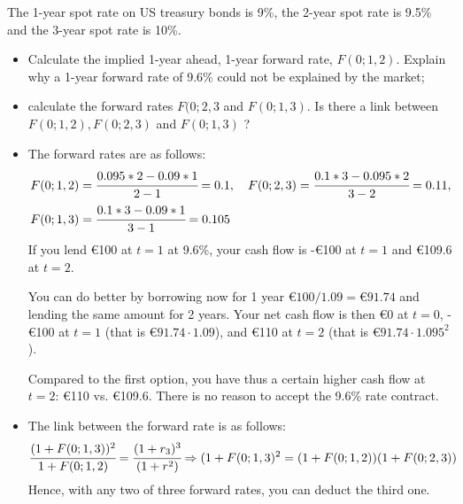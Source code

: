 \documentclass[12pt,a4paper]{book}
\begin{document}
\begin{exercise}[subtitle=Forward Rate]
The 1-year spot rate on US treasury bonds is 9\%, the 2-year spot rate is 9.5\% and the 3-year spot rate is 10\%. 
\begin{itemize}
\item Calculate the implied 1-year ahead, 1-year forward rate, $F(0;1,2)$. Explain why a 1-year forward rate of 9.6\% could not be explained by the market;
\item calculate the forward rates  $F(0; 2, 3$ and $F(0; 1,3)$. Is there a link between $F(0;1,2),F(0;2,3)$ and $F(0;1,3)$ ?
\end{itemize}
\end{exercise}
\begin{solution}
\begin{itemize}
\item The forward rates are as follows:
\begin{equation}
\begin{aligned}
F(0;1,2) &= \cfrac{0.095*2 - 0.09*1}{2-1} = 0.1, \quad F(0;2,3)= \cfrac{0.1*3 - 0.095*2}{3-2} = 0.11, \\ 
F(0;1,3) &= \cfrac{0.1*3 - 0.09*1}{3-1} = 0.105
\end{aligned}
\end{equation}
If you lend €100 at $t=1$ at 9.6\%, your cash flow is -€100 at $t=1$ and €109.6 at $t=2$. 

You can do better by borrowing now for 1 year $€100/1.09=€91.74$ and lending the same amount for 2 years. Your net cash flow is then €0 at $t=0$, -€100 at $t=1$ (that is $€91.74\cdot 1.09$), and €110 at $t=2$ (that is $€91.74\cdot 1.095^2$). 

Compared to the first option, you have thus a certain higher cash flow at $t=2$: €110 vs. €109.6.  There is no reason to accept the 9.6\% rate contract. 
\item The link between the forward rate is as follows:
\begin{equation}
\cfrac{(1+F(0;1,3))^2}{1+F(0;1,2)} = \cfrac{(1+r_3)^3}{(1+r^2)} \Rightarrow (1+F(0;1,3)^2 = (1+F(0;1,2))(1+F(0;2,3))
\end{equation}
Hence, with any two of three forward rates, you can deduct the third one.
\end{itemize}
\end{solution}
\end{document}
